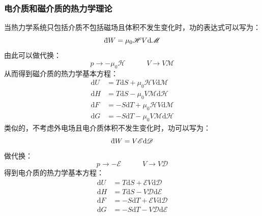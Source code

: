\documentclass[12pt]{article}
\newcommand \dbar {{\; \bar{} \hspace{-0.3em} \mathrm d}}%
\begin{document}
\subsubsection{电介质和磁介质的热力学理论}
\noindent
当热力学系统只包括介质不包括磁场且体积不发生变化时，功的表达式可以写为：
\begin{equation}
	\dbar W=\mu_0 \mathscr{H} V\mathrm{d}\mathscr{M}
\end{equation}
由此可以做代换：
\begin{equation}
	p \to -\mu_0\mathscr{H}\quad \quad \quad V\to V\mathscr{M}
	\label{x43}
\end{equation}
从而得到磁介质的热力学基本方程：
\begin{equation}
	\begin{split}
	\mathrm{d}U&=T\mathrm{d}S+\mu_0 \mathscr{H}V\mathrm{d}\mathscr{M}\\
	\mathrm{d}H&=T\mathrm{d}S-\mu_0V\mathscr{M}\mathrm{d}\mathscr{H}\\
	\mathrm{d}F&=-S\mathrm{d}T+\mu_0 \mathscr{H}V\mathrm{d}\mathscr{M}\\
	\mathrm{d}G&=-S\mathrm{d}T-\mu_0V\mathscr{M}\mathrm{d}\mathscr{H} 
\end{split}
\end{equation}
类似的，不考虑外电场且电介质体积不发生变化时，功可以写为：
\begin{equation}
	\dbar W=V\mathscr{E}\mathrm{d}\mathscr{D}
\end{equation}
做代换：
\begin{equation}
	p\to -\mathscr{E} \quad \quad \quad V\to V\mathscr{D}
\end{equation}	
得到电介质的热力学基本方程：
\begin{equation}
	\begin{split}
			\mathrm{d}U&=T\mathrm{d}S+ \mathscr{E}V\mathrm{d}\mathscr{D}\\
		\mathrm{d}H&=T\mathrm{d}S-V\mathscr{D}\mathrm{d}\mathscr{E}\\
		\mathrm{d}F&=-S\mathrm{d}T+ \mathscr{E}V\mathrm{d}\mathscr{D}\\
		\mathrm{d}G&=-S\mathrm{d}T-V\mathscr{D}\mathrm{d}\mathscr{E} 
	\end{split}
\end{equation}	
\end{document}
